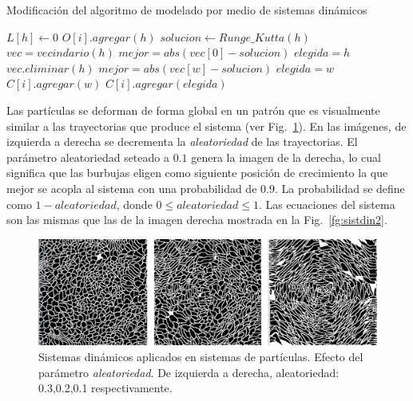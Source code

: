 \begin{algorithm}[h!]
\caption{Modificación del algoritmo de modelado por medio de sistemas dinámicos}
\begin{algorithmic}
\State $L[h]\gets 0$ 
\State $O[i].agregar(h)$
\State $solucion \gets Runge\_Kutta(h)$
\State $vec = vecindario(h)$
\State $mejor = abs(vec[0] - solucion)$
\State $elegida = h$
\State $vec.eliminar(h)$
        \State $mejor = abs(vec[w]-solucion)$
        \State $elegida = w$
    \EndIf
        \State $C[i].agregar(w)$
    \EndIf
\EndFor
{}
\State $C[i].agregar(elegida)$
\end{algorithmic}
\end{algorithm}

Las part\'iculas se deforman de forma global en un patr\'on que es visualmente similar a las trayectorias que produce el sistema (ver Fig.~\ref{fg:sistdin3}).
En las im\'agenes, de izquierda a derecha se decrementa la {\em aleatoriedad} de las trayectorias.
El par\'ametro aleatoriedad seteado a $0.1$ genera la imagen de la derecha, lo cual significa que las burbujas eligen como siguiente posición de crecimiento la que mejor se acopla al sistema con una probabilidad de $0.9$.
La probabilidad se define como $1-aleatoriedad$, donde $0 \leq aleatoriedad \leq 1$. Las ecuaciones del sistema son las mismas que las de la imagen derecha mostrada en la Fig.~\ref{fg:sistdin2}.

\begin{figure}[htb!]
  \centerline{\includegraphics[width=13cm]{sistdin3}}
  \caption[Sistemas din\'amicos aplicados en sistemas de part\'iculas]{Sistemas din\'amicos aplicados en sistemas de part\'iculas. Efecto del parámetro {\em aleatoriedad}. De izquierda a derecha, aleatoriedad: 0.3,0.2,0.1 respectivamente. }
  \label{fg:sistdin3}
\end{figure}

